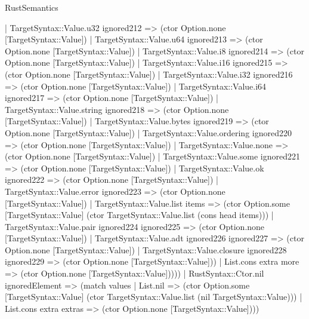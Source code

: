 \begin{lexlean}{RustSemantics}
\begin{semanticmodule}
{            | TargetSyntax::Value.u32 ignored212 => (ctor Option.none [TargetSyntax::Value])
            | TargetSyntax::Value.u64 ignored213 => (ctor Option.none [TargetSyntax::Value])
            | TargetSyntax::Value.i8 ignored214 => (ctor Option.none [TargetSyntax::Value])
            | TargetSyntax::Value.i16 ignored215 => (ctor Option.none [TargetSyntax::Value])
            | TargetSyntax::Value.i32 ignored216 => (ctor Option.none [TargetSyntax::Value])
            | TargetSyntax::Value.i64 ignored217 => (ctor Option.none [TargetSyntax::Value])
            | TargetSyntax::Value.string ignored218 => (ctor Option.none [TargetSyntax::Value])
            | TargetSyntax::Value.bytes ignored219 => (ctor Option.none [TargetSyntax::Value])
            | TargetSyntax::Value.ordering ignored220 => (ctor Option.none [TargetSyntax::Value])
            | TargetSyntax::Value.none => (ctor Option.none [TargetSyntax::Value])
            | TargetSyntax::Value.some ignored221 => (ctor Option.none [TargetSyntax::Value])
            | TargetSyntax::Value.ok ignored222 => (ctor Option.none [TargetSyntax::Value])
            | TargetSyntax::Value.error ignored223 => (ctor Option.none [TargetSyntax::Value])
            | TargetSyntax::Value.list items => (ctor Option.some [TargetSyntax::Value] (ctor TargetSyntax::Value.list (cons head items)))
            | TargetSyntax::Value.pair ignored224 ignored225 => (ctor Option.none [TargetSyntax::Value])
            | TargetSyntax::Value.adt ignored226 ignored227 => (ctor Option.none [TargetSyntax::Value])
            | TargetSyntax::Value.closure ignored228 ignored229 => (ctor Option.none [TargetSyntax::Value]))
          | List.cons extra more => (ctor Option.none [TargetSyntax::Value]))))
    | RustSyntax::Ctor.nil ignoredElement => (match values
      | List.nil => (ctor Option.some [TargetSyntax::Value] (ctor TargetSyntax::Value.list (nil TargetSyntax::Value)))
      | List.cons extra extras => (ctor Option.none [TargetSyntax::Value])))
}


\end{semanticmodule}
\end{lexlean}
